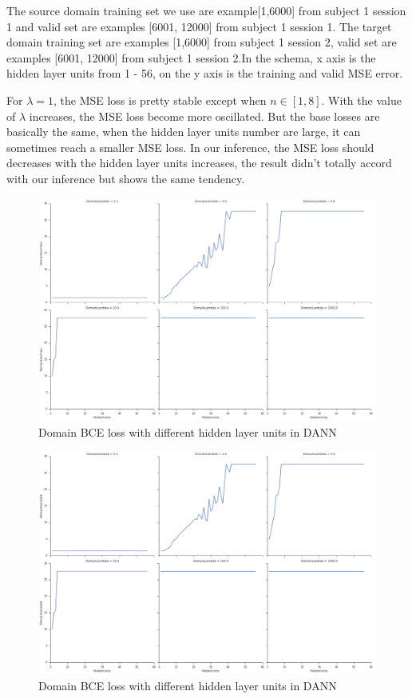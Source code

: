 The source domain training set we use are example[1,6000] from subject 1 session 1 and valid set are examples [6001, 12000] from subject 1 session 1. The target domain training set are examples [1,6000] from subject 1 session 2, valid set are examples [6001, 12000] from subject 1 session 2.In the schema, x axis is the hidden layer units from 1 - 56, on the y axis is the training and valid MSE error.

For $\lambda = 1$, the MSE loss is pretty stable except when $n \in [1,8]$. With the value of $\lambda$ increases, the MSE loss become more oscillated. But the base losses are basically the same, when the hidden layer units number are large, it can sometimes reach a smaller MSE loss. In our inference, the MSE loss should decreases with the hidden layer units increases, the result didn't totally accord with our inference but shows the same tendency. 

\begin{figure}[htbp]
	\centering
	\includegraphics[width=15cm]{Figures/8.png}
	\caption[Train Domain BCE loss with different hidden layer units in DANN]{Domain BCE loss with different hidden layer units in DANN}
	\label{fig:6}
\end{figure}
\begin{figure}[htbp]
	\centering
	\includegraphics[width=15cm]{Figures/6.png}
	\caption[Valid Domain BCE loss with different hidden layer units in DANN]{Domain BCE loss with different hidden layer units in DANN}
	\label{fig:8}
\end{figure}

